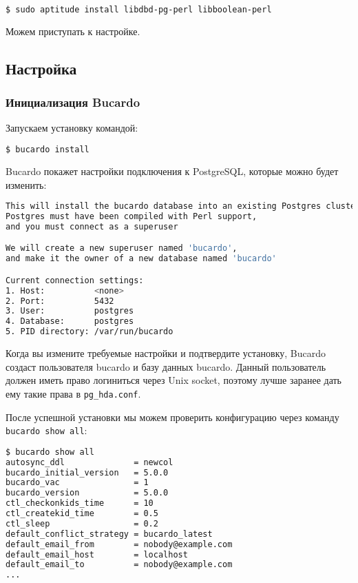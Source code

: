 \begin{lstlisting}[language=Bash,label=lst:bucardo-packet1,caption=Установка]
$ sudo aptitude install libdbd-pg-perl libboolean-perl
\end{lstlisting}

Можем приступать к настройке.

\subsection{Настройка}

\subsubsection{Инициализация Bucardo}

Запускаем установку командой:

\begin{lstlisting}[language=Bash,label=lst:bucardo5,caption=Инициализация Bucardo]
$ bucardo install
\end{lstlisting}

Bucardo покажет настройки подключения к PostgreSQL, которые можно будет изменить:

\begin{lstlisting}[language=Bash,label=lst:bucardo6,caption=Инициализация Bucardo]
This will install the bucardo database into an existing Postgres cluster.
Postgres must have been compiled with Perl support,
and you must connect as a superuser

We will create a new superuser named 'bucardo',
and make it the owner of a new database named 'bucardo'

Current connection settings:
1. Host:          <none>
2. Port:          5432
3. User:          postgres
4. Database:      postgres
5. PID directory: /var/run/bucardo
\end{lstlisting}

Когда вы измените требуемые настройки и подтвердите установку, Bucardo создаст пользователя bucardo и базу данных bucardo.
Данный пользователь должен иметь право логиниться через Unix socket, поэтому лучше заранее дать ему такие права в \lstinline!pg_hda.conf!.

После успешной установки мы можем проверить конфигурацию через команду \lstinline!bucardo show all!:

\begin{lstlisting}[language=Bash,label=lst:bucardo-status1,caption=Инициализация Bucardo]
$ bucardo show all
autosync_ddl              = newcol
bucardo_initial_version   = 5.0.0
bucardo_vac               = 1
bucardo_version           = 5.0.0
ctl_checkonkids_time      = 10
ctl_createkid_time        = 0.5
ctl_sleep                 = 0.2
default_conflict_strategy = bucardo_latest
default_email_from        = nobody@example.com
default_email_host        = localhost
default_email_to          = nobody@example.com
...
\end{lstlisting}

